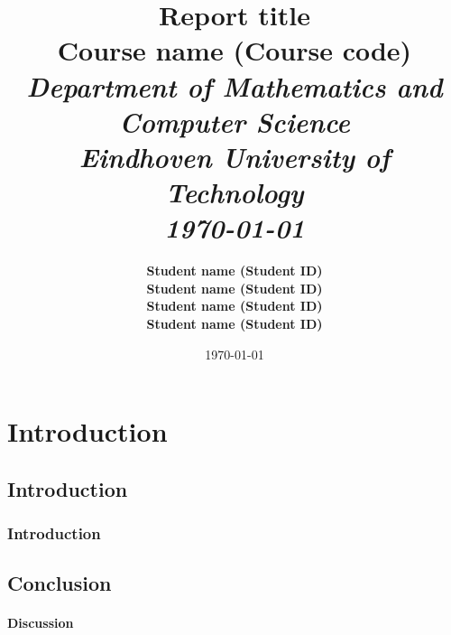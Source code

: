 \documentclass[11pt]{template/report} %
\title{\textbf{Report title} \\[0.5cm]
{\Large Course name (Course code) \\[1.0cm]
         \large \textit{Department of Mathematics and Computer Science \\[0.3cm]
                Eindhoven University of Technology \\[0.6cm]
         \small \today}}}
\author{\textbf{
            Student name (Student ID)\\[0.1cm]
            Student name (Student ID)\\[0.1cm]
            Student name (Student ID)\\[0.1cm]
            Student name (Student ID)}}
\date{\today}
\begin{document}
\thispagestyle{empty}

\maketitle
\newpage

\section{Introduction}
    
    \lipsum[1]
    
    \subsection{Introduction}
    
        \lipsum[2-3]
        
        \subsubsection*{Introduction}
        
            \lipsum[4]
        
    \subsection{Conclusion}
    
        \lipsum[5]
        
        \paragraph{Discussion} \lipsum[6]
        
\newpage



\end{document}
